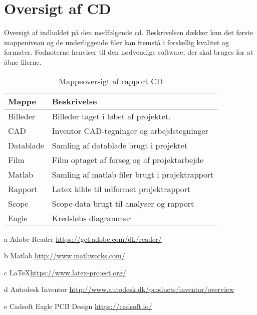 \newpage
\section{Oversigt af CD}\label{bilag:cd}
Oversigt af indholdet på den medfølgende cd. Beskrivelsen dækker kun det første mappeniveau og de underliggende filer kan fremstå i forskellig kvalitet og formater. Fodnoterne henviser til den nødvendige software, der skal bruges for at åbne filerne.

\begin{table}[h!]
\centering
\caption{Mappeoversigt af rapport CD}
\label{tab:ordliste}
\begin{threeparttable}
\begin{tabular}{l l}
\toprule
\multicolumn{1}{l}{Mappe}       &
\multicolumn{1}{l}{Beskrivelse}  \\ 
\midrule
Billeder					& Billeder taget i løbet af projektet. \\
CAD							& Inventor CAD-tegninger og arbejdstegninger\tnote{d} \\
Datablade					& Samling af datablade brugt i projektet \tnote{a}\\
Film						& Film optaget af forsøg og af projektarbejde \\
Matlab						& Samling af matlab filer brugt i projektrapport\tnote{b} \\
Rapport						& Latex kilde til udformet projektrapport\tnote{c} \\
Scope						& Scope-data brugt til analyser og rapport \\
Eagle						& Kredsløbs diagrammer\tnote{e} \\
\bottomrule
\end{tabular}
\begin{tablenotes}
\item[a] Adobe Reader  \url{https://get.adobe.com/dk/reader/}
\item[b] Matlab \url{http://www.mathworks.com/}
\item[c] \LaTeX \url{https://www.latex-project.org/}
\item[d] Autodesk Inventor \url{http://www.autodesk.dk/products/inventor/overview}
\item[e] Cadsoft Eagle PCB Design \url{https://cadsoft.io/}
\end{tablenotes}
\end{threeparttable}
\end{table}
\label{LastPage}

